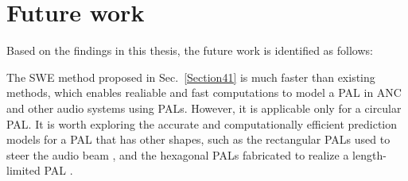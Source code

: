 \section{Future work}
Based on the findings in this thesis, the future work is identified as follows:

\begin{outline}
    \1 {
        The SWE method proposed in Sec.~\ref{Section41} is much faster than existing methods, which enables realiable and fast computations to model a PAL in ANC and other audio systems using PALs.
    However, it is applicable only for a circular PAL.
    It is worth exploring the accurate and computationally efficient prediction models  for a PAL that has other shapes, such as the rectangular PALs used to steer the audio beam \cite{Shi2013InvestigationSteerableParametric}, and the hexagonal PALs fabricated to realize a length-limited PAL \cite{Lam2014FeasibilityLengthlimitedParametric}.
}





\end{outline}
